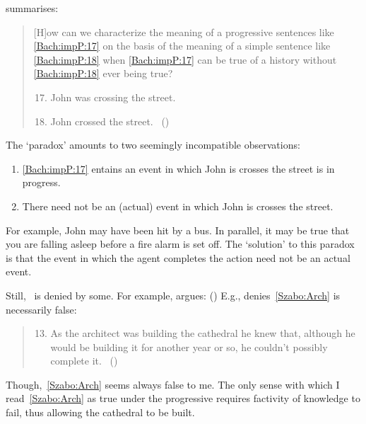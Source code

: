 \begin{note}
{    \citeauthor{Bach:1986tb} summarises:
    \begin{quote}
      [H]ow can we characterize the meaning of a progressive sentences like \ref{Bach:impP:17} on the basis of the meaning of a simple sentence like \ref{Bach:impP:18} when \ref{Bach:impP:17} can be true of a history without \ref{Bach:impP:18} ever being true?
      \begin{enumerate}[label=(\arabic*), ref=(\arabic*)]
        \setcounter{enumi}{16}
      \item
        \label{Bach:impP:17}
        John was crossing the street.
      \item
        \label{Bach:impP:18}
        John crossed the street.%
        \mbox{ }\hfill\mbox{(\citeyear[12]{Bach:1986tb})}
      \end{enumerate}
    \end{quote}
    The `paradox' amounts to two seemingly incompatible observations:
    \begin{enumerate}[noitemsep]
    \item
      \ref{Bach:impP:17} entains an event in which John is crosses the street is in progress.
    \item
      There need not be an (actual) event in which John is crosses the street.%
    \end{enumerate}
    For example, John may have been hit by a bus.
    In parallel, it may be true that you are falling asleep before a fire alarm is set off.
    The `solution' to this paradox is that the event in which the agent completes the action need not be an actual event.%

    Still,~ is denied by some.
    For example, \citeauthor{Szabo:2004ul} argues:
    (\citeyear[40]{Szabo:2004ul})
    E.g., \citeauthor{Szabo:2004ul} denies~\ref{Szabo:Arch} is necessarily false:
    \begin{quote}
      \begin{enumerate}[label=(\arabic*), ref=(\arabic*)]
        \setcounter{enumi}{12}
      \item
        \label{Szabo:Arch}
        As the architect was building the cathedral he knew that, although he would be building it for another year or so, he couldn't possibly complete it.%
        \mbox{ }\hfill\mbox{(\citeyear[38]{Szabo:2004ul})}
      \end{enumerate}
    \end{quote}
    Though,~\ref{Szabo:Arch} seems always false to me.
    The only sense with which I read~\ref{Szabo:Arch} as true under the progressive requires factivity of knowledge to fail, thus allowing the cathedral to be built.

}
\end{note}
